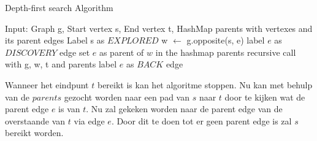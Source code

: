 \begin{algorithm}[h]
\caption{Depth-first search Algorithm}
\label{alg:DFS}
\begin{algorithmic}
\REQUIRE Input: Graph g, Start vertex s, End vertex t, HashMap parents with vertexes and its parent edges
\STATE Label s as $EXPLORED$
\STATE w $\gets$ g.opposite(s, e)
\STATE label $e$ as $DISCOVERY$ edge
\STATE set $e$ as parent of $w$ in the hashmap parents
\STATE recursive call with g, w, t and parents
\ELSE
\STATE label $e$ as $BACK$ edge
\ENDIF
\ENDIF
\ENDFOR
\end{algorithmic}
\end{algorithm}

Wanneer het eindpunt $t$ bereikt is kan het algoritme stoppen. Nu kan met behulp van de $parents$ gezocht worden naar een pad van $s$ naar $t$ door te kijken wat de parent edge $e$ is van $t$. Nu zal gekeken worden naar de parent edge van de overstaande van $t$ via edge $e$. Door dit te doen tot er geen parent edge is zal $s$ bereikt worden.